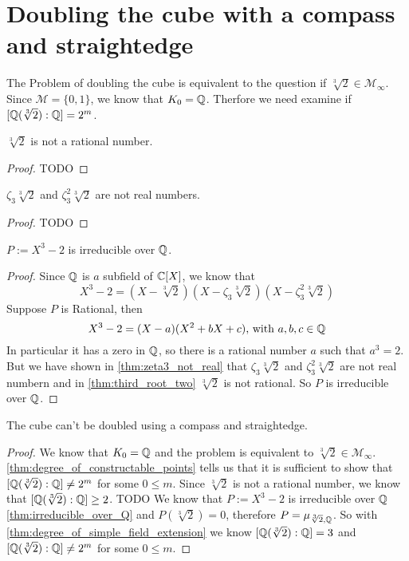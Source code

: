 \documentclass{../Proof_layout_PDF/TemplateExercise}
\begin{document}
\section{Doubling the cube with a compass and straightedge}
The Problem of doubling the cube is equivalent to the question if $\sqrt[3]{2} \in \mathcal{M}_{\infty}$.
Since $\mathcal{M} = \{0,1\}$, we know that $K_0 = \mathbb{Q}$. Therfore we need examine if $[\mathbb{Q}(\sqrt[3]{2}):\mathbb{Q}] = 2^m$.
\begin{lemma}
\label{thm:third_root_two}
    $\sqrt[3]{2}$ is not a rational number.
\end{lemma}

\begin{proof}
    TODO %
\end{proof}
\begin{lemma}
\label{thm:zeta3_not_real}
    $\zeta_3 \sqrt[3]{2}$ and $\zeta_3^2 \sqrt[3]{2}$ are not real numbers.
\end{lemma}
\begin{proof}
    TODO %
\end{proof}
\begin{theorem}
    $P := X^3 - 2$ is irreducible over $\mathbb{Q}$.
\label{thm:irreducible_over_Q}
\end{theorem}
\begin{proof}
    Since $\mathbb{Q}$ is $a$ subfield of $\mathbb{C} [X]$, we know that
    \begin{equation*}
        X^3 - 2 = (X - \sqrt[3]{2})(X -\zeta_3 \sqrt[3]{2})(X -\zeta_3^2 \sqrt[3]{2})
    \end{equation*}
    Suppose $P$ is Rational, then
    \begin{equation*}
        X^3 - 2 = (X - a)(X^2 + bX + c)\text{, with } a, b, c \in \mathbb{Q}
    \end{equation*}
    In particular it has a zero in $\mathbb{Q}$, so there is a rational number $a$ such that $a^3 = 2$.\newline
    But we have shown in \ref{thm:zeta3_not_real} that $\zeta_3 \sqrt[3]{2}$ and $\zeta_3^2 \sqrt[3]{2}$ are not real numbern and in \ref{thm:third_root_two} $\sqrt[3]{2}$ is not rational.
    So $P$ is irreducible over $\mathbb{Q}$.
\end{proof}
\begin{theorem}
    The cube can't be doubled using a compass and straightedge.
\end{theorem}
\begin{proof}
    We know that $K_0 = \mathbb{Q}$ and the problem is equivalent to $\sqrt[3]{2} \in \mathcal{M}_{\infty}$.\newline
    \ref{thm:degree_of_constructable_points} tells us that it is sufficient to show that $[\mathbb{Q}(\sqrt[3]{2}):\mathbb{Q}] \ne 2^m$ for some $0 \le m $.
    Since $\sqrt[3]{2}$ is not a rational number, we know that $[\mathbb{Q}(\sqrt[3]{2}):\mathbb{Q}] \ge 2$.
    TODO %
    \newline
    We know that $P := X^3 - 2$ is irreducible over $\mathbb{Q}$ \ref{thm:irreducible_over_Q} and $P(\sqrt[3]{2}) = 0$, therefore $P = \mu_{\sqrt[3]{2},\mathbb{Q}}$.
    So with \ref{thm:degree_of_simple_field_extension} we know $[\mathbb{Q}(\sqrt[3]{2}):\mathbb{Q}] = 3$ and $[\mathbb{Q}(\sqrt[3]{2}):\mathbb{Q}] \ne 2^m$ for some $0 \le m $.
\end{proof}
\end{document}
